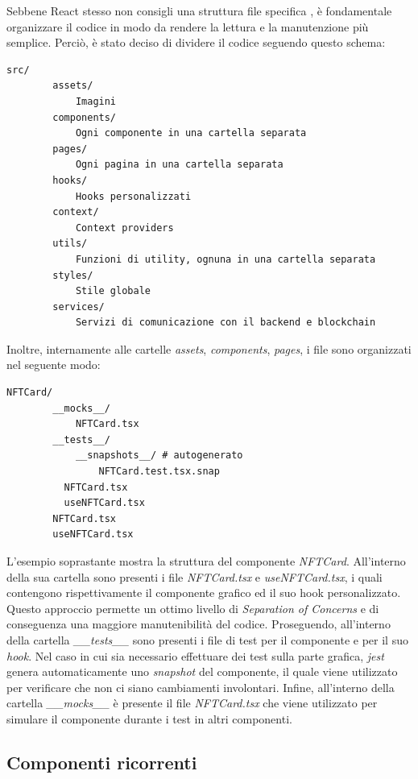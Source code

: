 Sebbene React stesso non consigli una struttura file specifica \cite{react-structure}, è fondamentale organizzare il codice in modo da rendere la lettura e la manutenzione più semplice. Perciò, è stato deciso di dividere il codice seguendo questo schema:

\begin{lstlisting}[basicstyle=\small]
    src/
        assets/
            Imagini
        components/
            Ogni componente in una cartella separata
        pages/
            Ogni pagina in una cartella separata
        hooks/
            Hooks personalizzati
        context/
            Context providers
        utils/
            Funzioni di utility, ognuna in una cartella separata
        styles/
            Stile globale
        services/
            Servizi di comunicazione con il backend e blockchain
\end{lstlisting}

Inoltre, internamente alle cartelle \textit{assets}, \textit{components}, \textit{pages}, i file sono organizzati nel seguente modo:

\begin{lstlisting}[basicstyle=\small]
    NFTCard/
        __mocks__/
            NFTCard.tsx
        __tests__/
            __snapshots__/ # autogenerato
                NFTCard.test.tsx.snap 
          NFTCard.tsx
          useNFTCard.tsx
        NFTCard.tsx
        useNFTCard.tsx
\end{lstlisting}

L'esempio soprastante mostra la struttura del componente \textit{NFTCard}. All'interno della sua cartella sono presenti i file \textit{NFTCard.tsx} e \textit{useNFTCard.tsx}, i quali contengono rispettivamente il componente grafico ed il suo hook personalizzato. Questo approccio permette un ottimo livello di \textit{Separation of Concerns} e di conseguenza una maggiore manutenibilità del codice. Proseguendo, all'interno della cartella \textit{\_\_tests\_\_} sono presenti i file di test per il componente e per il suo \textit{hook}. Nel caso in cui sia necessario effettuare dei test sulla parte grafica, \textit{jest} genera automaticamente uno \textit{snapshot} del componente, il quale viene utilizzato per verificare che non ci siano cambiamenti involontari. Infine, all'interno della cartella \textit{\_\_mocks\_\_} è presente il file \textit{NFTCard.tsx} che viene utilizzato per simulare il componente durante i test in altri componenti.

\subsection{Componenti ricorrenti}

